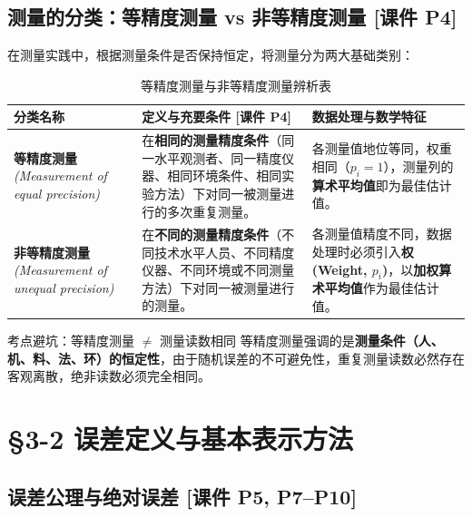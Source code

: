\documentclass[11pt,a4paper]{ctexart}
\begin{document}
\subsection{测量的分类：等精度测量 vs 非等精度测量 \textnormal{[课件 P4]}}

在测量实践中，根据测量条件是否保持恒定，将测量分为两大基础类别：

\begin{table}[htbp]
\centering
\small
\renewcommand{\arraystretch}{1.3}
\begin{tabularx}{\textwidth}{p{3.2cm}Xp{4.5cm}}
\toprule
\textbf{分类名称} & \textbf{定义与充要条件 [课件 P4]} & \textbf{数据处理与数学特征} \\
\midrule
\textbf{等精度测量}\newline\textit{(Measurement of equal precision)} & 在\textbf{相同的测量精度条件}（同一水平观测者、同一精度仪器、相同环境条件、相同实验方法）下对同一被测量进行的多次重复测量。 & 各测量值地位等同，权重相同（$p_i = 1$），测量列的\textbf{算术平均值}即为最佳估计值。 \\
\midrule
\textbf{非等精度测量}\newline\textit{(Measurement of unequal precision)} & 在\textbf{不同的测量精度条件}（不同技术水平人员、不同精度仪器、不同环境或不同测量方法）下对同一被测量进行的测量。 & 各测量值精度不同，数据处理时必须引入\textbf{权 (Weight, $p_i$)}，以\textbf{加权算术平均值}作为最佳估计值。 \\
\bottomrule
\end{tabularx}
\caption{等精度测量与非等精度测量辨析表}
\end{table}

\begin{tipbox}{考点避坑：等精度测量 $\neq$ 测量读数相同}
等精度测量强调的是\textbf{测量条件（人、机、料、法、环）的恒定性}，由于随机误差的不可避免性，重复测量读数必然存在客观离散，绝非读数必须完全相同。
\end{tipbox}

\section{§3-2 误差定义与基本表示方法}

\subsection{误差公理与绝对误差 \textnormal{[课件 P5, P7--P10]}}
\end{document}
